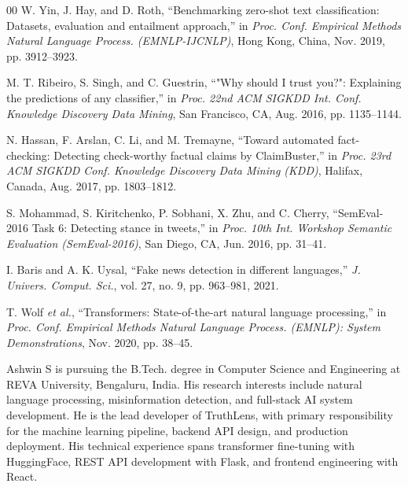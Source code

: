 \documentclass[journal]{IEEEtran}
\begin{document}
\begin{thebibliography}{00}
W. Yin, J. Hay, and D. Roth, ``Benchmarking zero-shot text classification: Datasets,
evaluation and entailment approach,'' in \textit{Proc. Conf. Empirical Methods Natural
Language Process. (EMNLP-IJCNLP)}, Hong Kong, China, Nov. 2019, pp. 3912--3923.

M. T. Ribeiro, S. Singh, and C. Guestrin, ``"Why should I trust you?": Explaining the
predictions of any classifier,'' in \textit{Proc. 22nd ACM SIGKDD Int. Conf. Knowledge
Discovery Data Mining}, San Francisco, CA, Aug. 2016, pp. 1135--1144.

N. Hassan, F. Arslan, C. Li, and M. Tremayne, ``Toward automated fact-checking: Detecting
check-worthy factual claims by ClaimBuster,'' in \textit{Proc. 23rd ACM SIGKDD Conf.
Knowledge Discovery Data Mining (KDD)}, Halifax, Canada, Aug. 2017, pp. 1803--1812.

S. Mohammad, S. Kiritchenko, P. Sobhani, X. Zhu, and C. Cherry, ``SemEval-2016 Task 6:
Detecting stance in tweets,'' in \textit{Proc. 10th Int. Workshop Semantic Evaluation
(SemEval-2016)}, San Diego, CA, Jun. 2016, pp. 31--41.

I. Baris and A. K. Uysal, ``Fake news detection in different languages,'' \textit{J.
Univers. Comput. Sci.}, vol. 27, no. 9, pp. 963--981, 2021.

T. Wolf \textit{et al.}, ``Transformers: State-of-the-art natural language processing,''
in \textit{Proc. Conf. Empirical Methods Natural Language Process. (EMNLP): System
Demonstrations}, Nov. 2020, pp. 38--45.

\end{thebibliography}


\begin{IEEEbiographynophoto}{Ashwin S}
is pursuing the B.Tech. degree in Computer Science and Engineering at REVA University,
Bengaluru, India. His research interests include natural language processing, misinformation
detection, and full-stack AI system development. He is the lead developer of TruthLens,
with primary responsibility for the machine learning pipeline, backend API design, and
production deployment. His technical experience spans transformer fine-tuning with
HuggingFace, REST API development with Flask, and frontend engineering with React.
\end{IEEEbiographynophoto}
\end{document}
